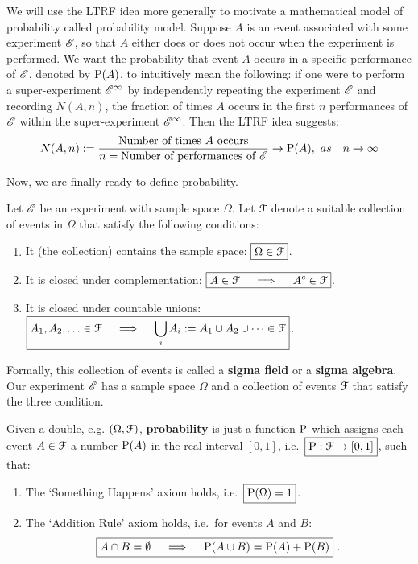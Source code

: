 We will use the LTRF idea more generally to motivate a mathematical model of probability called probability model.  Suppose $A$ is an event associated with some experiment $\EE{E}$, so that $A$ either does or does not occur when the experiment is performed.  We want the probability that event $A$ occurs in a specific performance of $\EE{E}$, denoted by $\P(A)$, to intuitively mean the following:  if one were to perform a super-experiment $\EE{E}^{\infty}$ by independently repeating the experiment $\EE{E}$ and recording $N(A,n)$, the fraction of times $A$ occurs in the first $n$ performances of $\EE{E}$ within the super-experiment $\EE{E}^{\infty}$. Then the LTRF idea suggests:
\begin{equation}\label{E:NofAn}
N(A,n) :=  \frac{\text{Number of times $A$ occurs}}{n=\text{Number of performances of $\EE{E}$}} \to \P(A), \ as \quad  n \to \infty
\end{equation}

Now, we are finally ready to define probability.
\begin{definition}[Probability]\label{D:Prob}
Let $\EE{E}$ be an experiment with sample space $\Omega$.  Let $\C{F}$ denote a suitable collection of events in $\Omega$ that satisfy the following conditions:
\begin{enumerate}
\item It (the collection) contains the sample space:
$\boxed{
\Omega \in \C{F} }$.
\item It is closed under complementation:
$\boxed{
A \in \C{F} \quad \implies \quad A^c \in \C{F} }$.
\item It is closed under countable unions:
$\boxed{
A_1, A_2, \ldots \in \C{F} \quad \implies \quad \bigcup_{i} {A_i} := A_1 \cup A_2 \cup \cdots \in \C{F} }$.
\end{enumerate}
Formally, this collection of events is called a {\bf sigma field} or a {\bf sigma algebra}.  Our experiment $\EE{E}$ has a sample space $\Omega$ and a collection of events $\C{F}$ that satisfy the three condition. 

Given a double, e.g. $(\Omega, \C{F})$, {\bf probability} is just a function $\P$ which assigns each event $A \in \C{F}$ a number $\P(A)$ in the real interval $[0,1]$, i.e.~$\boxed{\P : \C{F} \to [0,1] }$, such that:
\begin{enumerate}
\item The `Something Happens' axiom holds, i.e.~$\boxed{\P(\Omega) = 1}$. 
\item The `Addition Rule' axiom holds, i.e.~for events $A$ and $B$:
$$
\boxed{
A \cap B = \emptyset \quad \implies \quad \P(A \cup B) = \P(A) + \P(B)
} \ .
$$
\end{enumerate}
\end{definition}
